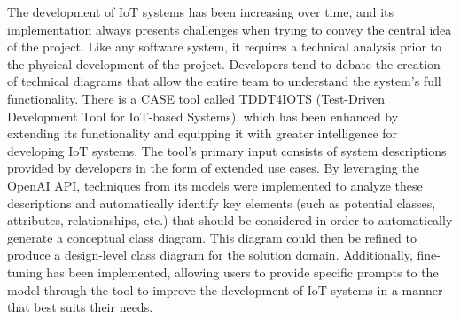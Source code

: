 
The development of IoT systems has been increasing over time, and its implementation always presents challenges when trying to convey the central idea of the project. Like any software system, it requires a technical analysis prior to the physical development of the project. Developers tend to debate the creation of technical diagrams that allow the entire team to understand the system's full functionality. There is a CASE tool called TDDT4IOTS (Test-Driven Development Tool for IoT-based Systems), which has been enhanced by extending its functionality and equipping it with greater intelligence for developing IoT systems. The tool's primary input consists of system descriptions provided by developers in the form of extended use cases. By leveraging the OpenAI API, techniques from its models were implemented to analyze these descriptions and automatically identify key elements (such as potential classes, attributes, relationships, etc.) that should be considered in order to automatically generate a conceptual class diagram. This diagram could then be refined to produce a design-level class diagram for the solution domain. Additionally, fine-tuning has been implemented, allowing users to provide specific prompts to the model through the tool to improve the development of IoT systems in a manner that best suits their needs.
